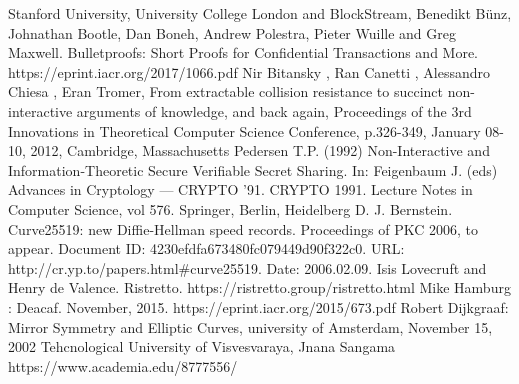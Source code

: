 \documentclass{article}
\begin{document}
\begin{thebibliography}{99}

 Stanford University, University College London and BlockStream, Benedikt Bünz, Johnathan Bootle, Dan Boneh, Andrew Polestra, Pieter Wuille and Greg Maxwell. Bulletproofs: Short Proofs for Confidential Transactions and More.\\ https://eprint.iacr.org/2017/1066.pdf
 Nir Bitansky , Ran Canetti , Alessandro Chiesa , Eran Tromer, From extractable collision resistance to succinct non-interactive arguments of knowledge, and back again, Proceedings of the 3rd Innovations in Theoretical Computer Science Conference, p.326-349, January 08-10, 2012, Cambridge, Massachusetts
 Pedersen T.P. (1992) Non-Interactive and Information-Theoretic Secure Verifiable Secret Sharing. In: Feigenbaum J. (eds) Advances in Cryptology — CRYPTO ’91. CRYPTO 1991. Lecture Notes in Computer Science, vol 576. Springer, Berlin, Heidelberg
 D. J. Bernstein. Curve25519: new Diffie-Hellman speed records. Proceedings of PKC 2006, to appear. Document ID: 4230efdfa673480fc079449d90f322c0. URL: http://cr.yp.to/papers.html\#curve25519. Date: 2006.02.09.
 Isis Lovecruft and Henry de Valence. Ristretto. https://ristretto.group/ristretto.html
 Mike Hamburg : Deacaf. November, 2015. https://eprint.iacr.org/2015/673.pdf
Robert Dijkgraaf: Mirror Symmetry and Elliptic Curves, university of Amsterdam, November 15, 2002
 Tehcnological University of Visvesvaraya, Jnana Sangama https://www.academia.edu/8777556/

\end{thebibliography}
\end{document}
